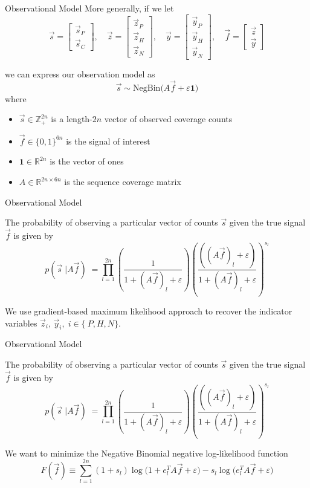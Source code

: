\documentclass[10pt, t]{beamer}
\begin{document}
\begin{frame}{Observational Model}
More generally, if we let  
$$\vec{s} = \begin{bmatrix}
	\vec{s}_P \\ \vec{s}_C
\end{bmatrix}, \quad 
\vec{z} = \begin{bmatrix}
	\vec{z}_P \\ \vec{z}_H \\ \vec{z}_N
\end{bmatrix}, \quad 
\vec{y} = \begin{bmatrix}
	\vec{y}_P \\ \vec{y}_H \\ \vec{y}_N
\end{bmatrix}, \quad  
\vec{f} = \begin{bmatrix}
	\vec{z} \\ \vec{y}
\end{bmatrix}$$

we can express our observation model as
$$\vec{s} \sim \text{NegBin}(A \vec{f} + \varepsilon \mathbf{1)}$$
where
\begin{itemize}
	\item $\vec{s} \in \mathbb{Z}_{+}^{2n}$ is a length-$2n$ vector of observed coverage counts
	\item $\vec{f} \in \{0,1\}^{6n}$ is the signal of interest
	\item $\mathbf{1} \in \mathbb{R}^{2n}$ is the vector of ones
	\item $A \in \mathbb{R}^{2n \times 6n}$ is the sequence coverage matrix
\end{itemize}

\end{frame}

\begin{frame}{Observational Model}
	
	The probability of observing a particular vector of counts $\vec{s}$ given the true signal $\vec{f}$ is given by
	\medskip 
	$$p(\vec{s} \; | A\vec{f})\; = \prod_{l=1}^{2n} \left( \frac{1}{1+ (A \vec{f})_l + \varepsilon} \right) \left(  \frac{((A \vec{f})_l + \varepsilon)}{1+ (A \vec{f})_l + \varepsilon} \right)^{s_l} $$
	
	\medskip
	We use gradient-based maximum likelihood approach to recover the indicator variables $\vec{z}_i, \, \vec{y}_i, \; i \in \{\ P,H,N\}$. 
\end{frame}

\begin{frame}{Observational Model}
	
	The probability of observing a particular vector of counts $\vec{s}$ given the true signal $\vec{f}$ is given by
	\medskip 
	$$p(\vec{s} \; | A\vec{f})\; = \prod_{l=1}^{2n} \left( \frac{1}{1+ (A \vec{f})_l + \varepsilon} \right) \left(  \frac{((A \vec{f})_l + \varepsilon)}{1+ (A \vec{f})_l + \varepsilon} \right)^{s_l} $$
	
	\medskip
	We want to minimize the Negative Binomial negative log-likelihood function
	$$F(\vec{f}) \equiv \sum_{l=1}^{2n}  (1 + s_l)\log \big(1+ e_l^T A \vec{f} + \varepsilon \big) - s_l \log \big( e_l^T A \vec{f} + \varepsilon \big)$$
\end{frame}
\end{document}
